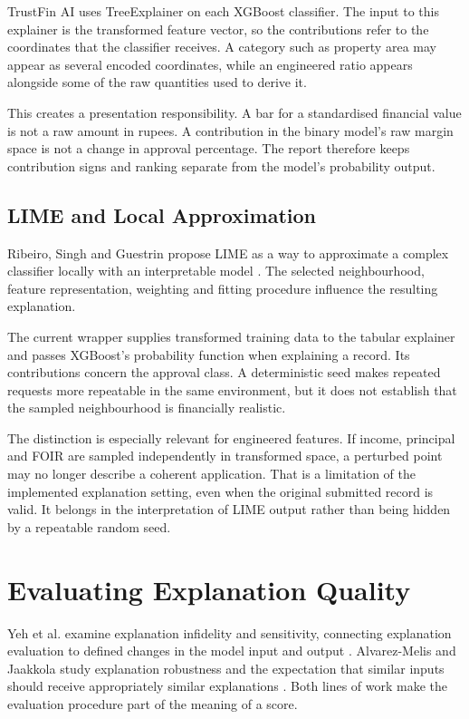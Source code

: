 TrustFin AI uses TreeExplainer on each XGBoost classifier. The input to this explainer is the transformed feature vector, so the contributions refer to the coordinates that the classifier receives. A category such as property area may appear as several encoded coordinates, while an engineered ratio appears alongside some of the raw quantities used to derive it.

This creates a presentation responsibility. A bar for a standardised financial value is not a raw amount in rupees. A contribution in the binary model's raw margin space is not a change in approval percentage. The report therefore keeps contribution signs and ranking separate from the model's probability output.

\subsection{LIME and Local Approximation}
Ribeiro, Singh and Guestrin propose LIME as a way to approximate a complex classifier locally with an interpretable model \cite{ribeiro2016}. The selected neighbourhood, feature representation, weighting and fitting procedure influence the resulting explanation.

The current wrapper supplies transformed training data to the tabular explainer and passes XGBoost's probability function when explaining a record. Its contributions concern the approval class. A deterministic seed makes repeated requests more repeatable in the same environment, but it does not establish that the sampled neighbourhood is financially realistic.

The distinction is especially relevant for engineered features. If income, principal and FOIR are sampled independently in transformed space, a perturbed point may no longer describe a coherent application. That is a limitation of the implemented explanation setting, even when the original submitted record is valid. It belongs in the interpretation of LIME output rather than being hidden by a repeatable random seed.

\section{Evaluating Explanation Quality}
Yeh et al. examine explanation infidelity and sensitivity, connecting explanation evaluation to defined changes in the model input and output \cite{yeh2019}. Alvarez-Melis and Jaakkola study explanation robustness and the expectation that similar inputs should receive appropriately similar explanations \cite{alvarezm2018}. Both lines of work make the evaluation procedure part of the meaning of a score.

